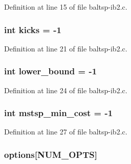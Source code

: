 Definition at line 15 of file baltsp-ib2.c.\hypertarget{bin_2baltsp-ib2_8c_b8f057ba1ad6b7f0c46f8140b25b3467}{
\subsubsection[{kicks}]{\setlength{\rightskip}{0pt plus 5cm}int {\bf kicks} = -1}}
\label{bin_2baltsp-ib2_8c_b8f057ba1ad6b7f0c46f8140b25b3467}




Definition at line 21 of file baltsp-ib2.c.\hypertarget{bin_2baltsp-ib2_8c_ed7394fd8e0c2796b26b9654fd10fd9d}{
\subsubsection[{lower\_\-bound}]{\setlength{\rightskip}{0pt plus 5cm}int {\bf lower\_\-bound} = -1}}
\label{bin_2baltsp-ib2_8c_ed7394fd8e0c2796b26b9654fd10fd9d}




Definition at line 24 of file baltsp-ib2.c.\hypertarget{bin_2baltsp-ib2_8c_79e1b33b7d744b8baacfe9c0b2e73013}{
\subsubsection[{mstsp\_\-min\_\-cost}]{\setlength{\rightskip}{0pt plus 5cm}int {\bf mstsp\_\-min\_\-cost} = -1}}
\label{bin_2baltsp-ib2_8c_79e1b33b7d744b8baacfe9c0b2e73013}




Definition at line 27 of file baltsp-ib2.c.\hypertarget{bin_2baltsp-ib2_8c_cea6a9709d519c143f30db401a0d0c72}{
\subsubsection[{options}]{ {\bf options}\mbox{[}NUM\_\-OPTS\mbox{]}}}
\label{bin_2baltsp-ib2_8c_cea6a9709d519c143f30db401a0d0c72}




